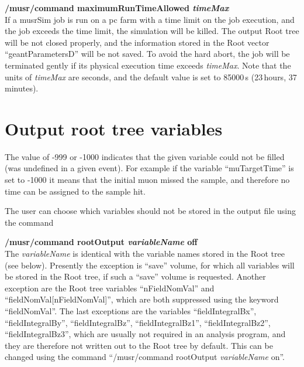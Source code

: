 \documentclass[twoside]{dis04}
\begin{document}
\begin{description}
\item{\bf /musr/command maximumRunTimeAllowed \emph{timeMax}}\\
	If a musrSim job is run on a pc farm with a time limit on the job execution,
	and the job exceeds the time limit, the simulation will be killed.
	The output Root tree will be not closed properly, and the
	information stored in the Root vector ``geantParametersD''
	will be not saved.  To avoid the hard abort,
	the job will be terminated gently if its physical execution time
	exceeds \emph{timeMax}.  
	Note that the units of \emph{timeMax} are seconds,
	and the default value is set to 85000\,s (23\,hours, 37\,minutes).
\end{description}
\section{Output root tree variables}
The value of -999 or -1000 indicates that the given variable could not be filled
(was undefined in a given event).
For example if the variable ``muTargetTime'' is set to -1000 it means that the initial muon missed the sample, 
and therefore no time can be assigned to the sample hit.

The user can choose which variables should not be stored in the output file using the command
\begin{description}
\item{\bf /musr/command rootOutput \emph{variableName} off} \\
	The \emph{variableName} is identical with the variable names stored in the Root tree
	(see below).  Presently the exception is ``save'' volume, for which all variables
	will be stored in the Root tree, if such a ``save'' volume is requested.
	Another exception are the Root tree variables ``nFieldNomVal'' and ``fieldNomVal[nFieldNomVal]'',
	which are both suppressed using the keyword ``fieldNomVal''.
	The last exceptions are the variables ``fieldIntegralBx'',
	``fieldIntegralBy'', ``fieldIntegralBz'', ``fieldIntegralBz1'', 
	``fieldIntegralBz2'', ``fieldIntegralBz3'', which are usually not required
	in an analysis program, and they are therefore not written out to the Root tree by default.  
	This can be changed using the command ``/musr/command rootOutput \emph{variableName} on''.
\end{description}
\end{document}
